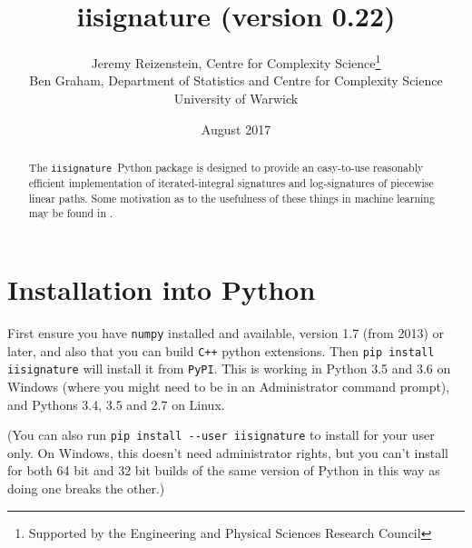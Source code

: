 \documentclass[a4paper]{extarticle}
\begin{document}
\title{iisignature (version 0.22)}
\author{Jeremy Reizenstein, Centre for Complexity Science\thanks{Supported by the Engineering and Physical Sciences Research Council}
\\Ben Graham, Department of Statistics and Centre for Complexity Science
\\University of Warwick}
\date{August 2017}
\maketitle

\def\ii{{\texttt{iisignature}}}
\def\pypi{{\texttt{PyPI}}}
\def\numpy{{\texttt{numpy}}}
\def\scipy{{\texttt{scipy}}}
\def\i#1{\index{#1@\texttt{#1}}}
\def \hilite#1{\underline{\color{blue}\textbf{#1}}}

\begin{abstract}
The \ii\ Python package is designed to provide an easy-to-use reasonably efficient implementation of iterated-integral signatures and log-signatures of piecewise linear paths. Some motivation as to the usefulness of these things in machine learning may be found in \cite{OxSigIntro}.
\end{abstract}

\begin{minipage}{0.6\textwidth}
\tableofcontents
\end{minipage}
\section{Installation into Python}
First ensure you have \verb|numpy| installed and available, version 1.7 (from 2013) or later, and also that you can build \verb|C++| python extensions. 
Then \verb|pip install iisignature| will install it from \pypi. This is working in Python 3.5 and 3.6 on Windows (where you might need to be in an Administrator command prompt), and Pythons 3.4, 3.5 and 2.7 on Linux.

{\small (You can also run \verb|pip install --user iisignature| to install for your user only. On Windows, this doesn't need administrator rights, but you can't install for both 64 bit and 32 bit builds of the same version of Python in this way as doing one breaks the other.)}
\end{document}
